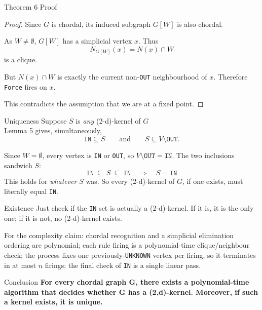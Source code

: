 \documentclass[11pt]{beamer}
\begin{document}
\begin{frame}{Theorem 6 Proof}
  \begin{proof}
    Since $G$ is chordal, its induced subgraph $G[W]$ is also chordal.

    \smallskip
    As $W\neq\emptyset$, $G[W]$ has a simplicial vertex $x$.
    Thus
    \[
      N_{G[W]}(x)=N(x)\cap W
    \]
    is a clique.

    \smallskip
    But $N(x)\cap W$ is exactly the current non-\texttt{OUT}
    neighbourhood of $x$. Therefore \texttt{Force} fires on $x$.

    \smallskip
    This contradicts the assumption that we are at a fixed point.

  \end{proof}
\end{frame}

\begin{frame}{Uniqueness}
  Suppose $S$ is \emph{any} (2-d)-kernel of $G$\\
  Lemma 5 gives, simultaneously,
  \[
    \texttt{IN}\subseteq S
    \qquad\text{and}\qquad
    S \subseteq V\setminus\texttt{OUT}.
  \]

  \smallskip
  Since $W=\emptyset$, every vertex is \texttt{IN} or \texttt{OUT}, so
  $V\setminus\texttt{OUT}=\texttt{IN}$. The two inclusions sandwich $S$:
  \[
    \boxed{\texttt{IN}\ \subseteq\ S\ \subseteq\ \texttt{IN}
      \quad\Longrightarrow\quad S=\texttt{IN}}
  \]
  This holds for \emph{whatever} $S$ was. So every (2-d)-kernel of $G$,
  if one exists, must literally equal \texttt{IN}.
\end{frame}

\begin{frame}{Existence}
  Just check if the \texttt{IN} set is actually a (2-d)-kernel. If it is, it is the only one; if it is not, no (2-d)-kernel exists.

  \smallskip
  For the complexity claim: chordal recognition and a simplicial elimination
  ordering are polynomial; each rule firing is a
  polynomial-time clique/neighbour check; the process fixes one previously-\texttt{UNKNOWN}
  vertex per firing, so it terminates in at most $n$ firings; the final check
  of \texttt{IN} is a single linear pass.
\end{frame}

\begin{frame}{Conclusion}
  \textbf{For every chordal graph G, there exists a polynomial-time algorithm that decides whether G has a (2,d)-kernel.
    Moreover, if such a kernel exists, it is unique.}
\end{frame}
\end{document}
